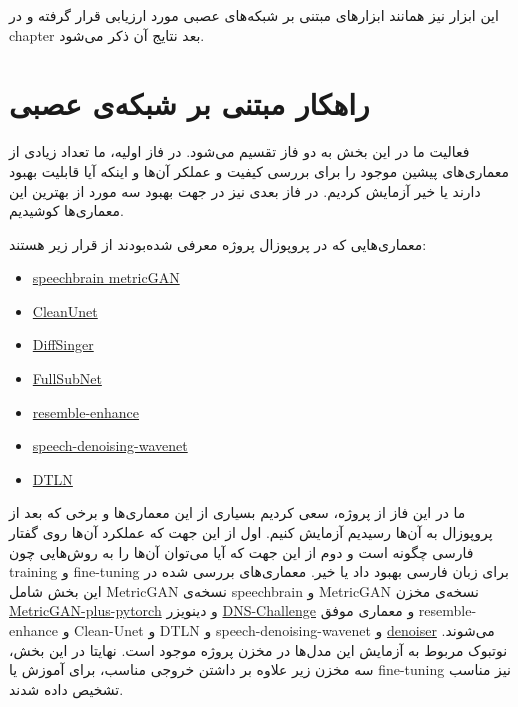 \documentclass[fleqn]{report}
\begin{document}
این ابزار نیز همانند ابزار‌های مبتنی بر شبکه‌های عصبی مورد ارزیابی قرار گرفته و در chapter بعد نتایج آن ذکر می‌شود.

\section{راهکار مبتنی بر شبکه‌ی عصبی}
فعالیت ما در این بخش به دو فاز تقسیم می‌شود.
در فاز اولیه، ما تعداد زیادی از معماری‌های پیشین موجود را برای بررسی کیفیت و عملکر آن‌ها و اینکه آیا قابلیت بهبود دارند یا خیر آزمایش کردیم.
در فاز بعدی نیز در جهت بهبود سه مورد از بهترین این معماری‌ها کوشیدیم.

معماری‌هایی که در پروپوزال پروژه معرفی شده‌بودند از قرار زیر هستند:

\begin{itemize}
    \item \href{https://github.com/speechbrain/speechbrain/tree/develop/recipes/Voicebank/enhance/MetricGAN}{speechbrain metricGAN}
    \item \href{https://github.com/nvidia/cleanunet}{CleanUnet}
    \item \href{https://github.com/keonlee9420/DiffSinger}{DiffSinger}
    \item \href{https://github.com/haoxiangsnr/FullSubNet}{FullSubNet}
    \item \href{https://github.com/resemble-ai/resemble-enhance}{resemble-enhance}
    \item \href{https://github.com/drethage/speech-denoising-wavenet}{speech-denoising-wavenet}
    \item \href{https://github.com/breizhn/DTLN}{DTLN}
\end{itemize}

ما در این فاز از پروژه، سعی کردیم بسیاری از این معماری‌ها و برخی که بعد از پروپوزال به آن‌ها رسیدیم آزمایش کنیم.
اول از این جهت که عملکرد آن‌ها روی گفتار فارسی چگونه است و دوم از این جهت که آیا می‌توان آن‌ها را به روش‌هایی چون training و fine-tuning برای زبان فارسی بهبود داد یا خیر.
معماری‌های بررسی شده در این بخش شامل 
MetricGAN نسخه‌ی speechbrain و MetricGAN نسخه‌ی مخزن \href{https://github.com/wooseok-shin/MetricGAN-plus-pytorch}{MetricGAN-plus-pytorch}
و 
دینویزر \href{https://github.com/microsoft/DNS-Challenge}{DNS-Challenge}
و 
معماری موفق resemble-enhance
و 
Clean-Unet
 و DTLN
 و 
 speech-denoising-wavenet
 و
 \href{https://github.com/facebookresearch/denoiser}{denoiser} 
 می‌شوند.
 نوتبوک مربوط به آزمایش این مدل‌ها در مخزن پروژه موجود است.
نهایتا در این بخش، سه مخزن 
زیر علاوه بر داشتن خروجی مناسب، برای آموزش یا fine-tuning نیز مناسب تشخیص داده شدند.
\end{document}
